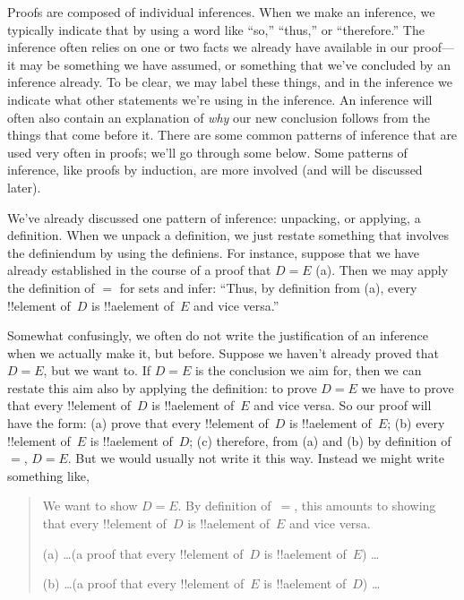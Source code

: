 \documentclass[../../../include/open-logic-section]{subfiles}
\begin{document}


Proofs are composed of individual inferences. When we make an
inference, we typically indicate that by using a word like ``so,''
``thus,'' or ``therefore.''  The inference often relies on one or two
facts we already have available in our proof---it may be something we
have assumed, or something that we've concluded by an inference
already.  To be clear, we may label these things, and in the inference
we indicate what other statements we're using in the inference.  An
inference will often also contain an explanation of \emph{why} our new
conclusion follows from the things that come before it.  There are
some common patterns of inference that are used very often in proofs;
we'll go through some below. Some patterns of inference, like proofs
by induction, are more involved (and will be discussed later).

We've already discussed one pattern of inference: unpacking, or
applying, a definition. When we unpack a definition, we just restate
something that involves the definiendum by using the definiens. For
instance, suppose that we have already established in the course of a
proof that $D = E$ (a). Then we may apply the definition of $=$ for sets
and infer: ``Thus, by definition from (a), every !!{element}
of~$D$ is !!a{element} of~$E$ and vice versa.''

Somewhat confusingly, we often do not write the justification of an
inference when we actually make it, but before.  Suppose we haven't
already proved that $D = E$, but we want to.  If $D = E$ is the
conclusion we aim for, then we can restate this aim also by applying
the definition: to prove $D = E$ we have to prove that every
!!{element} of~$D$ is !!a{element} of~$E$ and vice versa.  So our
proof will have the form: (a) prove that every !!{element} of~$D$ is
!!a{element} of~$E$; (b) every !!{element} of~$E$ is !!a{element}
of~$D$; (c) therefore, from (a) and (b) by definition of $=$, $D = E$.
But we would usually not write it this way. Instead we might write
something like,
\begin{quote}
We want to show $D = E$. By definition of~$=$, this amounts to showing
that every !!{element} of~$D$ is !!a{element} of~$E$ and vice
versa.

(a) \dots (a proof that every !!{element} of~$D$ is !!a{element}
of~$E$) \dots

(b) \dots (a proof that every !!{element}
of~$E$ is !!a{element} of~$D$) \dots
\end{quote}
\end{document}
